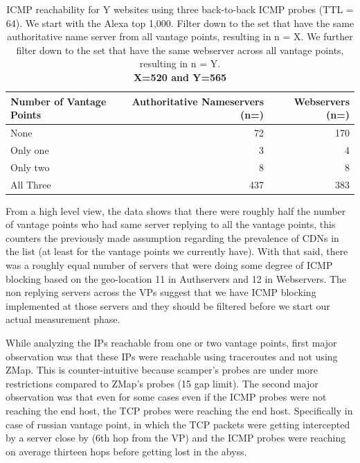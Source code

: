 \begin{table}
\small

    \begin{center}

    \begin{tabular}{|l|r|r|} \hline
        Number of Vantage Points &
        Authoritative Nameservers 
        (n=) &
        Webservers
        (n=)

        \\ \hline

        None    & 72 & 170 \\ \hline
        Only one & 3 & 4 \\ \hline
        Only two & 8 & 8 \\ \hline
        All Three & 437 & 383 \\ \hline
       
       
    \end{tabular}

    \caption{ICMP reachability for Y websites using three back-to-back ICMP
        probes (TTL = 64). We start with the
        Alexa top 1,000.  Filter down to the set that have the same
        authoritative name server from all vantage points, resulting in n =  X.
        We further filter down to the set that have the same webserver across
    all vantage points, resulting in n = Y.\\ \textbf{X=520 and Y=565}}
    \label{tab:ICMPreachabilityacrossvantages}

    \end{center}
\end{table}

From a high level view, the data shows that there were roughly half the number of vantage points who had same server replying to all the vantage points, this counters the previously made assumption regarding the prevalence of CDNs in the list (at least for the vantage points we currently have). With that said, there was a roughly equal number of servers that were doing some degree of ICMP blocking based on the geo-location 11 in Authservers and 12 in Webservers. The non replying servers across the VPs suggest that we have ICMP blocking implemented at those servers and they should be filtered before we start our actual measurement phase.

While analyzing the IPs reachable from one or two vantage points, first major observation was that these IPs were reachable using traceroutes and not using ZMap. This is counter-intuitive because scamper's probes are under more restrictions compared to ZMap's probes (15 gap limit). The second major observation was that even for some cases even if the ICMP probes were not reaching the end host, the TCP probes were reaching the end host. Specifically in case of russian vantage point, in which the TCP packets were getting intercepted by a server close by (6th hop from the VP) and the ICMP probes were reaching on average thirteen hops before getting lost in the abyss. 

